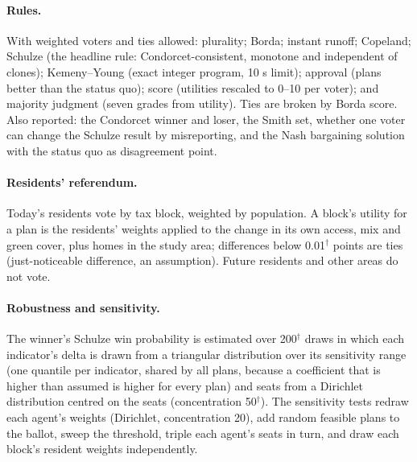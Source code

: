 \documentclass[10pt]{article}
\begin{document}
\paragraph{Rules.} With weighted voters and ties allowed: plurality; Borda; instant runoff; Copeland; Schulze (the
headline rule: Condorcet-consistent, monotone and independent of clones); Kemeny--Young (exact integer program, 10 s
limit); approval (plans better than the status quo); score (utilities rescaled to 0--10 per voter); and majority
judgment (seven grades from utility). Ties are broken by Borda score. Also reported: the Condorcet winner and loser, the
Smith set, whether one voter can change the Schulze result by misreporting, and the Nash bargaining solution with the
status quo as disagreement point.

\paragraph{Residents' referendum.} Today's residents vote by tax block, weighted by population. A block's utility for a
plan is the residents' weights applied to the change in its own access, mix and green cover, plus homes in the study
area; differences below 0.01$^\dagger$ points are ties (just-noticeable difference, an assumption). Future residents
and other areas do not vote.

\paragraph{Robustness and sensitivity.} The winner's Schulze win probability is estimated over 200$^\dagger$
draws in which each indicator's delta is drawn from a triangular distribution over its sensitivity range (one quantile
per indicator, shared by all plans, because a coefficient that is higher than assumed is higher for every plan) and
seats from a Dirichlet distribution centred on the seats (concentration 50$^\dagger$). The sensitivity tests
redraw each agent's weights (Dirichlet, concentration 20), add random feasible plans to the ballot, sweep the
threshold, triple each agent's seats in turn, and draw each block's resident weights independently.
\end{document}
